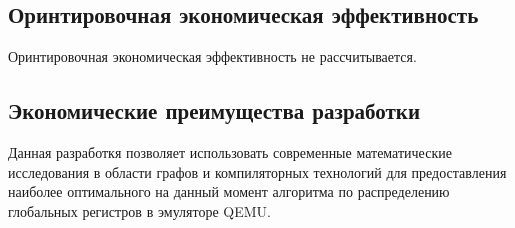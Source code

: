 \subsection{Оринтировочная экономическая эффективность}
Оринтировочная экономическая эффективность не рассчитывается.

\subsection{Экономические преимущества разработки}
Данная разработкя позволяет использовать современные математические исследования в области графов и компиляторных технологий для предоставления наиболее оптимального на данный момент алгоритма по распределению глобальных регистров в эмуляторе QEMU.